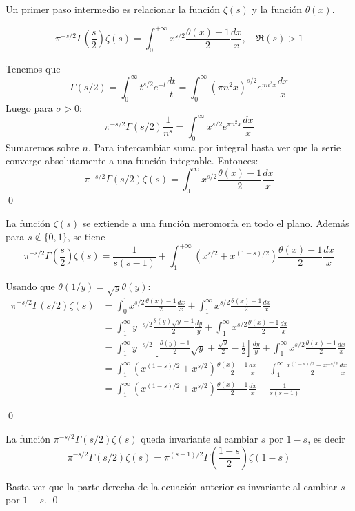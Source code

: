 \documentclass[TAN.tex]{subfiles}
\begin{document}
Un primer paso intermedio es relacionar la función $ζ(s)$ y la función $θ(x)$.
\begin{prop}
\[ π^{-s/2} Γ\left(\frac{s}{2}\right) ζ(s) = \int_0^{+∞} x^{s/2} \frac{θ(x)-1}{2} \frac{dx}{x}, \quad \Re(s) > 1 \]
\end{prop}
\begin{dem}
Tenemos que
\[ Γ(s/2) = \int_0^{∞} t^{s/2}e^{-t} \frac{dt}{t} = \int_0^{∞}(πn^2x)^{s/2}e^{πn^2x} \frac{dx}{x}\]
Luego para $σ>0$:
\[ π^{-s/2}Γ(s/2)\frac{1}{n^s} = \int_0^{∞}x^{s/2}e^{πn^2x}\frac{dx}{x}\]
Sumaremos sobre $n$. Para intercambiar suma por integral basta ver que la serie converge absolutamente a una función integrable. Entonces:
\[ π^{-s/2}Γ(s/2)ζ(s) = \int_0^{∞}x^{s/2}\frac{θ(x)-1}{2} \frac{dx}{x}\]
\qed
\end{dem}
\begin{prop}
La función $ζ(s)$ se extiende a una función meromorfa en todo el plano.
Además para $s \notin \{0,1\}$, se tiene
\[ π^{-s/2} Γ\left(\frac{s}{2}\right) ζ(s) = \frac{1}{s(s-1)} + \int_1^{+∞} (x^{s/2}+x^{(1-s)/2})\frac{θ(x)-1}{2} \frac{dx}{x} \]
\end{prop}
\begin{dem}
Usando que $θ(1/y)=\sqrt{y}θ(y)$:
\begin{align*}
	π^{-s/2}Γ(s/2)ζ(s) & = \int_0^1 x^{s/2}\frac{θ(x)-1}{2} \frac{dx}{x} +  \int_1^{∞} x^{s/2}\frac{θ(x)-1}{2} \frac{dx}{x}\\
	& = \int_1^{∞} y^{-s/2}\frac{θ(y)\sqrt{y}-1}{2} \frac{dy}{y} +  \int_1^{∞} x^{s/2}\frac{θ(x)-1}{2} \frac{dx}{x}\\
	& = \int_1^{∞} y^{-s/2}\left[\frac{θ(y)-1}{2}\sqrt{y}+\frac{\sqrt{y}}{2}-\frac{1}{2}\right] \frac{dy}{y} +  \int_1^{∞} x^{s/2}\frac{θ(x)-1}{2} \frac{dx}{x}\\
	& = \int_1^{∞} (x^{(1-s)/2}+x^{s/2})\frac{θ(x)-1}{2} \frac{dx}{x} + \int_1^{∞} \frac{x^{(1-s)/2}-x^{-s/2}}{2} \frac{dx}{x}\\
	& = \int_1^{∞} (x^{(1-s)/2}+x^{s/2})\frac{θ(x)-1}{2} \frac{dx}{x} + \frac{1}{s(s-1)}
\end{align*}

\qed
\end{dem}

\begin{teorema} La función $π^{-s/2} Γ(s/2) ζ(s)$ queda invariante al cambiar $s$ por $1-s$, es decir
\[ π^{-s/2} Γ(s/2) ζ(s) = π^{(s-1)/2} Γ\left(\frac{1-s}{2}\right) ζ(1-s) \]
\end{teorema}
\begin{dem}
Basta ver que la parte derecha de la ecuación anterior es invariante al cambiar $s$ por $1-s$.
\qed
\end{dem}
\end{document}
